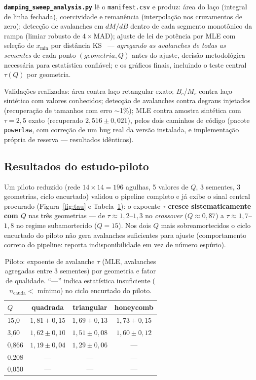 \documentclass[11pt,a4paper]{article}
\newcommand{\code}[1]{\texttt{#1}}
\begin{document}
\textbf{\code{damping\_sweep\_analysis.py}} lê o \code{manifest.csv} e
produz: área do laço (integral de linha fechada), coercividade e
remanência (interpolação nos cruzamentos de zero); detecção de
avalanches em $dM/dB$ dentro de cada segmento monotônico da rampa
(limiar robusto de $4\times$MAD); ajuste de lei de potência por MLE com
seleção de $x_{\min}$ por distância KS~\cite{clauset2009} ---
\emph{agregando as avalanches de todas as sementes} de cada ponto
$(geometria, Q)$ antes do ajuste, decisão metodológica necessária para
estatística confiável; e os gráficos finais, incluindo o teste central
$\tau(Q)$ por geometria.

Validações realizadas: área contra laço retangular exato; $B_c$/$M_r$
contra laço sintético com valores conhecidos; detecção de avalanches
contra degraus injetados (recuperação de tamanhos com erro
$\sim$1\%); MLE contra amostra sintética com $\tau = 2{,}5$ exato
(recuperado $2{,}516 \pm 0{,}021$), pelos dois caminhos de código
(pacote \code{powerlaw}, com correção de um bug real da versão
instalada, e implementação própria de reserva --- resultados idênticos).

\subsection{Resultados do estudo-piloto}

Um piloto reduzido (rede $14\times14 = 196$ agulhas, 5 valores de $Q$,
3 sementes, 3 geometrias, ciclo encurtado) validou o pipeline completo
e já exibe o sinal central procurado
(Figura~\ref{fig:tau} e Tabela~\ref{tab:piloto}): o expoente $\tau$
\textbf{cresce sistematicamente com $Q$} nas três geometrias --- de
$\tau \approx 1{,}2$--$1{,}3$ no \emph{crossover} ($Q \approx 0{,}87$)
a $\tau \approx 1{,}7$--$1{,}8$ no regime subamortecido ($Q = 15$). Nos
dois $Q$ mais sobreamortecidos o ciclo encurtado do piloto não gera
avalanches suficientes para ajuste (comportamento correto do pipeline:
reporta indisponibilidade em vez de número espúrio).

\begin{table}[h]
\centering
\small
\caption{Piloto: expoente de avalanche $\tau$ (MLE, avalanches agregadas
entre 3 sementes) por geometria e fator de qualidade. ``---'' indica
estatística insuficiente ($n_{\mathrm{cauda}} < $ mínimo) no ciclo
encurtado do piloto.}
\label{tab:piloto}
\begin{tabular}{@{}lccc@{}}
\toprule
$Q$ & quadrada & triangular & honeycomb \\
\midrule
15{,}0  & $1{,}81 \pm 0{,}15$ & $1{,}69 \pm 0{,}13$ & $1{,}73 \pm 0{,}15$ \\
3{,}60  & $1{,}62 \pm 0{,}10$ & $1{,}51 \pm 0{,}08$ & $1{,}60 \pm 0{,}12$ \\
0{,}866 & $1{,}19 \pm 0{,}04$ & $1{,}29 \pm 0{,}06$ & --- \\
0{,}208 & --- & --- & --- \\
0{,}050 & --- & --- & --- \\
\bottomrule
\end{tabular}
\end{table}
\end{document}

